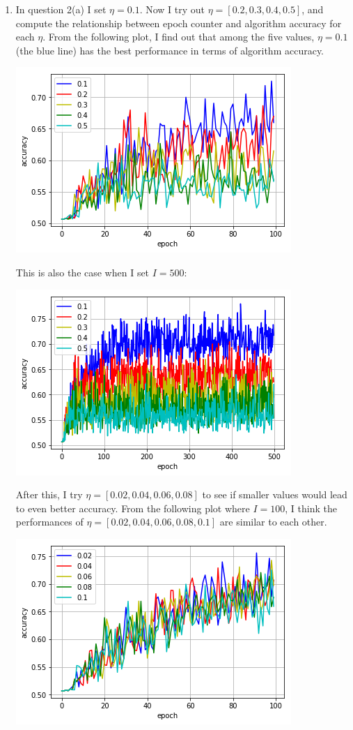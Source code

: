 \documentclass[paper=letter, fontsize=12pt]{article}
\begin{document}
\begin{enumerate}
\begin{enumerate}
	\item 
	In question 2(a) I set $\eta = 0.1$. Now I try out $\eta = [0.2, 0.3, 0.4, 0.5]$, and compute the relationship between epoch counter and algorithm accuracy for each $\eta$. From the following plot, I find out that among the five values, $\eta = 0.1$ (the blue line) has the best performance in terms of algorithm accuracy.
	
	\includegraphics[scale=0.5]{p2q2b1.png}
	
	This is also the case when I set $I = 500$:
	
	\includegraphics[scale=0.5]{p2q2b3.png}
	
	After this, I try $\eta = [0.02, 0.04, 0.06, 0.08]$ to see if smaller values would lead to even better accuracy. From the following plot where $I = 100$, I think the performances of $\eta = [0.02, 0.04, 0.06, 0.08, 0.1]$ are similar to each other.
	
	\includegraphics[scale=0.5]{p2q2b2.png}
	

\end{enumerate}
\end{enumerate}
\end{document}
